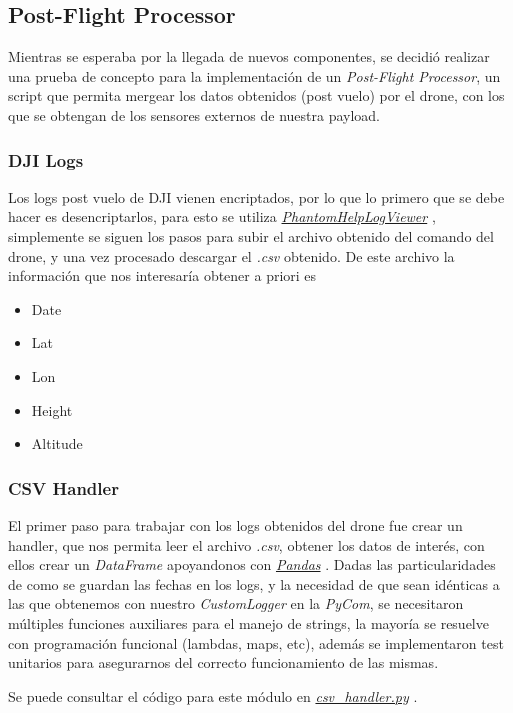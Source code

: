 \documentclass[12pt]{article}
\begin{document}
\subsection{Post-Flight Processor}
Mientras se esperaba por la llegada de nuevos componentes, se decidió realizar una prueba de concepto para la implementación de un \textit{Post-Flight Processor}, un script que permita mergear los datos obtenidos (post vuelo) por el drone, con los que se obtengan de los sensores externos de nuestra payload.

\subsubsection{DJI Logs}
Los logs post vuelo de DJI vienen encriptados, por lo que lo primero que se debe hacer es desencriptarlos, para esto se utiliza \href{https://www.phantomhelp.com/logviewer/upload/}{\textit{PhantomHelpLogViewer}} \cite{phantomhelp}, simplemente se siguen los pasos para subir el archivo obtenido del comando del drone, y una vez procesado descargar el \textit{.csv} obtenido.
De este archivo la información que nos interesaría obtener a priori es 
\begin{itemize}
  \item Date
  \item Lat
  \item Lon
  \item Height
  \item Altitude
\end{itemize}

\subsubsection{CSV Handler}
El primer paso para trabajar con los logs obtenidos del drone fue crear un handler, que nos permita leer el archivo \textit{.csv}, obtener los datos de interés, con ellos crear un \textit{DataFrame} apoyandonos con \href{https://pandas.pydata.org/}{\textit{Pandas}} \cite{pydata}.
Dadas las particularidades de como se guardan las fechas en los logs, y la necesidad de que sean idénticas a las que obtenemos con nuestro \textit{CustomLogger} en la \textit{PyCom}, se necesitaron múltiples funciones auxiliares para el manejo de strings, la mayoría se resuelve con programación funcional (lambdas, maps, etc), además se implementaron test unitarios para asegurarnos del correcto funcionamiento de las mismas.

Se puede consultar el código para este módulo en \href{https://github.com/sofia-am/DJI\_Payload\_Development/blob/main/log/post\_flight\_logger\_processor/src/csv\_handler.py}{\textit{csv\_handler.py}} \cite{repo2}.
\end{document}
